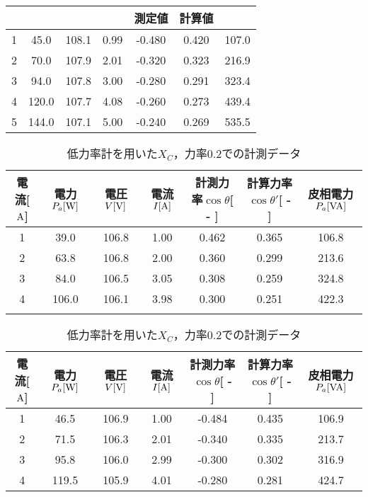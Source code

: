 \begin{table}
\begin{tabular}{|c|c|c|c|c|c|c|}
     \cline{5-6}
   & \multicolumn{1}{c|}{} & \multicolumn{1}{c|}{} & \multicolumn{1}{c|}{} & \multicolumn{1}{c|}{測定値} & \multicolumn{1}{c|}{計算値} &  \\ 
   \hline\hline
1 & 45.0  & 108.1 & 0.99 & -0.480 & 0.420 & 107.0 \\
2 & 70.0  & 107.9 & 2.01 & -0.320 & 0.323 & 216.9 \\
3 & 94.0  & 107.8 & 3.00 & -0.280 & 0.291 & 323.4 \\
4 & 120.0 & 107.7 & 4.08 & -0.260 & 0.273 & 439.4 \\
5 & 144.0 & 107.1 & 5.00 & -0.240 & 0.269 & 535.5 \\\hline
    \end{tabular}
 \end{table}

\begin{table}[h]
\centering
\caption{低力率計を用いた$X_{L}$，力率$0.2$での計測データ}
\label{tab:low0.2XL}
\begin{tabular}{ccccccc}
	\hline
	電流[$\rm{A}$] & 電力$P_a[\rm{W}]$ & 電圧$V[\rm{V}]$ & 電流$I[\rm{A}]$ & 計測力率$\cos \theta$[ - ] & 計算力率$\cos \theta '$[ - ] & 皮相電力$P_a[\rm{VA}]$ \\ \hline
	1 & 39.0  & 106.8 & 1.00 & 0.462 & 0.365 & 106.8 \\
	2 & 63.8  & 106.8 & 2.00 & 0.360 & 0.299 & 213.6 \\
	3 & 84.0  & 106.5 & 3.05 & 0.308 & 0.259 & 324.8 \\
	4 & 106.0 & 106.1 & 3.98 & 0.300 & 0.251 & 422.3 \\ \hline\\
\end{tabular}
\caption{低力率計を用いた$X_{C}$，力率$0.2$での計測データ}
\label{tab:low0.2XC}
\begin{tabular}{ccccccc}
\hline
電流[$\rm{A}$] & 電力$P_a[\rm{W}]$ & 電圧$V[\rm{V}]$ & 電流$I[\rm{A}]$ & 計測力率$\cos \theta$[ - ] & 計算力率$\cos \theta '$[ - ] & 皮相電力$P_a[\rm{VA}]$ \\ \hline
1 & 46.5  & 106.9 & 1.00 & -0.484 & 0.435 & 106.9 \\
2 & 71.5  & 106.3 & 2.01 & -0.340 & 0.335 & 213.7 \\
3 & 95.8  & 106.0 & 2.99 & -0.300 & 0.302 & 316.9 \\
4 & 119.5 & 105.9 & 4.01 & -0.280 & 0.281 & 424.7 \\ \hline
\end{tabular}
\end{table}
